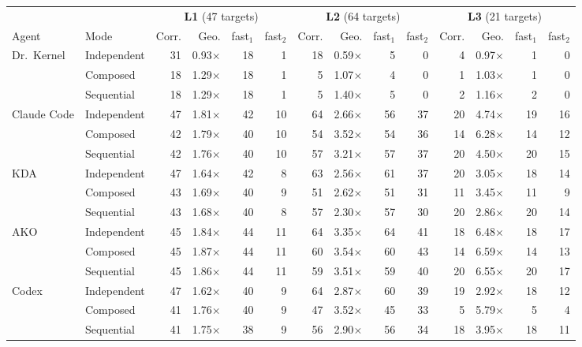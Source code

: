 \begin{tabular}{@{}llrrrrrrrrrrrr@{}}
\toprule
 & & \multicolumn{4}{c}{\textbf{L1} (47 targets)} & \multicolumn{4}{c}{\textbf{L2} (64 targets)} & \multicolumn{4}{c}{\textbf{L3} (21 targets)} \\
\cmidrule(lr){3-6}\cmidrule(lr){7-10}\cmidrule(lr){11-14}
Agent & Mode & Corr. & Geo. & fast$_{1}$ & fast$_{2}$ & Corr. & Geo. & fast$_{1}$ & fast$_{2}$ & Corr. & Geo. & fast$_{1}$ & fast$_{2}$ \\
\midrule
\multirow{3}{*}{Dr.~Kernel} & Independent & 31 & 0.93$\times$ & 18 & 1 & 18 & 0.59$\times$ & 5 & 0 & 4 & 0.97$\times$ & 1 & 0 \\
 & Composed & 18 & 1.29$\times$ & 18 & 1 & 5 & 1.07$\times$ & 4 & 0 & 1 & 1.03$\times$ & 1 & 0 \\
 & Sequential & 18 & 1.29$\times$ & 18 & 1 & 5 & 1.40$\times$ & 5 & 0 & 2 & 1.16$\times$ & 2 & 0 \\
\midrule
\multirow{3}{*}{Claude Code} & Independent & 47 & 1.81$\times$ & 42 & 10 & 64 & 2.66$\times$ & 56 & 37 & 20 & 4.74$\times$ & 19 & 16 \\
 & Composed & 42 & 1.79$\times$ & 40 & 10 & 54 & 3.52$\times$ & 54 & 36 & 14 & 6.28$\times$ & 14 & 12 \\
 & Sequential & 42 & 1.76$\times$ & 40 & 10 & 57 & 3.21$\times$ & 57 & 37 & 20 & 4.50$\times$ & 20 & 15 \\
\midrule
\multirow{3}{*}{KDA} & Independent & 47 & 1.64$\times$ & 42 & 8 & 63 & 2.56$\times$ & 61 & 37 & 20 & 3.05$\times$ & 18 & 14 \\
 & Composed & 43 & 1.69$\times$ & 40 & 9 & 51 & 2.62$\times$ & 51 & 31 & 11 & 3.45$\times$ & 11 & 9 \\
 & Sequential & 43 & 1.68$\times$ & 40 & 8 & 57 & 2.30$\times$ & 57 & 30 & 20 & 2.86$\times$ & 20 & 14 \\
\midrule
\multirow{3}{*}{AKO} & Independent & 45 & 1.84$\times$ & 44 & 11 & 64 & 3.35$\times$ & 64 & 41 & 18 & 6.48$\times$ & 18 & 17 \\
 & Composed & 45 & 1.87$\times$ & 44 & 11 & 60 & 3.54$\times$ & 60 & 43 & 14 & 6.59$\times$ & 14 & 13 \\
 & Sequential & 45 & 1.86$\times$ & 44 & 11 & 59 & 3.51$\times$ & 59 & 40 & 20 & 6.55$\times$ & 20 & 17 \\
\midrule
\multirow{3}{*}{Codex} & Independent & 47 & 1.62$\times$ & 40 & 9 & 64 & 2.87$\times$ & 60 & 39 & 19 & 2.92$\times$ & 18 & 12 \\
 & Composed & 41 & 1.76$\times$ & 40 & 9 & 47 & 3.52$\times$ & 45 & 33 & 5 & 5.79$\times$ & 5 & 4 \\
 & Sequential & 41 & 1.75$\times$ & 38 & 9 & 56 & 2.90$\times$ & 56 & 34 & 18 & 3.95$\times$ & 18 & 11 \\
\bottomrule
\end{tabular}
